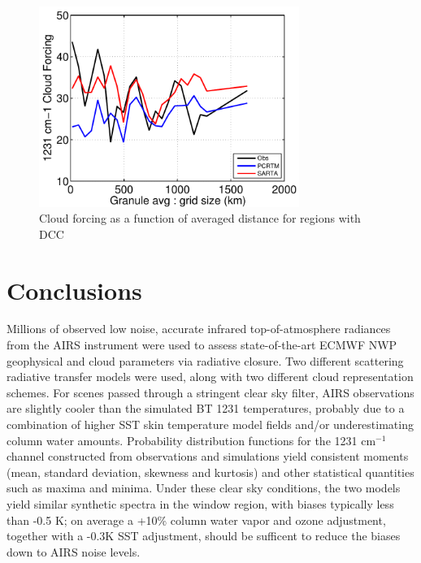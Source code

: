\documentclass[agupp]{aguplus}              %
\newcommand{\wn}{cm$^{-1}$\xspace}
\begin{document}
\begin{article}
\begin{figure}[h]
\noindent\includegraphics[width=20pc]{FIGS/ecm_cloudBT1231_gev_dcc_cloudforceVSgridsize}
\caption{Cloud forcing as a function of averaged distance for regions with DCC}
\label{dcc_cldforc}
\end{figure}

\section{Conclusions} 

Millions of observed low noise, accurate infrared top-of-atmosphere
radiances from the AIRS instrument were used to assess
state-of-the-art ECMWF NWP geophysical and cloud parameters via
radiative closure. Two different scattering radiative transfer models
were used, along with two different cloud representation schemes.  For
scenes passed through a stringent clear sky filter, AIRS observations
are slightly cooler than the simulated BT 1231 temperatures, probably
due to a combination of higher SST skin temperature model fields
and/or underestimating column water amounts.  Probability distribution
functions for the 1231 \wn channel constructed from observations and
simulations yield consistent moments (mean, standard deviation,
skewness and kurtosis) and other statistical quantities such as maxima
and minima. Under these clear sky conditions, the two models yield
similar synthetic spectra in the window region, with biases typically less
than -0.5 K; on average a +10\% column water vapor and ozone adjustment, 
together with a -0.3K SST adjustment, should be sufficent to reduce the biases
down to AIRS noise levels. 


\end{article}
\end{document}
